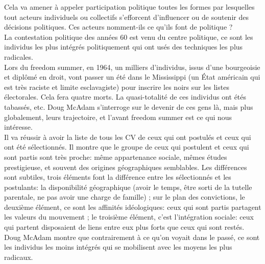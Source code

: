 \documentclass[10pt, a4paper, openany]{book}
\begin{document}
Cela va amener à appeler participation politique toutes les formes par lesquelles tout acteurs individuels ou collectifs s'efforcent d'influencer ou de soutenir des décisions politiques. Ces acteurs nomment-ils ce qu'ils font de politique ? \\
La contestation politique des années 60 est venu du centre politique, ce sont les individus les plus intégrés politiquement qui ont usés des techniques les plus radicales. \\
Lors du freedom summer, en 1964, un milliers d'individus, issus d'une bourgeoisie et diplômé en droit, vont passer un été dans le Mississippi (un État américain qui est très raciste et limite esclavagiste) pour inscrire les noirs sur les listes électorales. Cela fera quatre morts. La quasi-totalité de ces individus ont étés tabassés, etc. Doug McAdam s'interroge sur le devenir de ces gens là, mais plus globalement, leurs trajectoire, et l'avant freedom summer est ce qui nous intéresse. \\
Il va réussir à avoir la liste de tous les CV de ceux qui ont postulés et ceux qui ont été sélectionnés. Il montre que le groupe de ceux qui postulent et ceux qui sont partis sont très proche: même appartenance sociale, mêmes études prestigieuse, et souvent des origines géographiques semblables. Les différences sont subtiles, trois éléments font la différence entre les sélectionnés et les postulants: la disponibilité géographique (avoir le temps, être sorti de la tutelle parentale, ne pas avoir une charge de famille) ; sur le plan des convictions, le deuxième élément, ce sont les affinités idéologiques: ceux qui sont partis partagent les valeurs du mouvement ; le troisième élément, c'est l'intégration sociale: ceux qui partent disposaient de liens entre eux plus forts que ceux qui sont restés. \\
Doug McAdam montre que contrairement à ce qu'on voyait dans le passé, ce sont les individus les moins intégrés qui se mobilisent avec les moyens les plus radicaux. 
\end{document}
